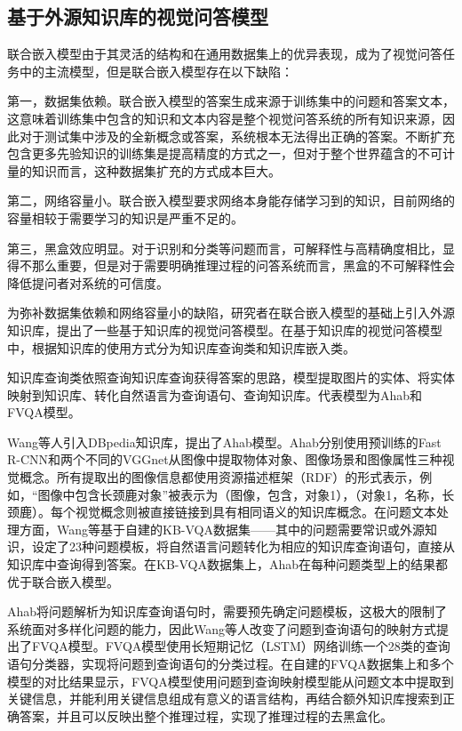 \subsection{基于外源知识库的视觉问答模型}
联合嵌入模型由于其灵活的结构和在通用数据集上的优异表现，成为了视觉问答任务中的主流模型，但是联合嵌入模型存在以下缺陷：

第一，数据集依赖。联合嵌入模型的答案生成来源于训练集中的问题和答案文本，这意味着训练集中包含的知识和文本内容是整个视觉问答系统的所有知识来源，因此对于测试集中涉及的全新概念或答案，系统根本无法得出正确的答案。不断扩充包含更多先验知识的训练集是提高精度的方式之一，但对于整个世界蕴含的不可计量的知识而言，这种数据集扩充的方式成本巨大。

第二，网络容量小。联合嵌入模型要求网络本身能存储学习到的知识，目前网络的容量相较于需要学习的知识是严重不足的。

第三，黑盒效应明显。对于识别和分类等问题而言，可解释性与高精确度相比，显得不那么重要，但是对于需要明确推理过程的问答系统而言，黑盒的不可解释性会降低提问者对系统的可信度。

为弥补数据集依赖和网络容量小的缺陷，研究者在联合嵌入模型的基础上引入外源知识库，提出了一些基于知识库的视觉问答模型。在基于知识库的视觉问答模型中，根据知识库的使用方式分为知识库查询类和知识库嵌入类。

知识库查询类依照查询知识库查询获得答案的思路，模型提取图片的实体、将实体映射到知识库、转化自然语言为查询语句、查询知识库。代表模型为Ahab和FVQA模型。

Wang等人引入DBpedia知识库，提出了Ahab模型。Ahab分别使用预训练的Fast R-CNN和两个不同的VGGnet从图像中提取物体对象、图像场景和图像属性三种视觉概念。所有提取出的图像信息都使用资源描述框架（RDF）的形式表示，例如，“图像中包含长颈鹿对象”被表示为（图像，包含，对象1），（对象1，名称，长颈鹿）。每个视觉概念则被直接链接到具有相同语义的知识库概念。在问题文本处理方面，Wang等基于自建的KB-VQA数据集——其中的问题需要常识或外源知识，设定了23种问题模板，将自然语言问题转化为相应的知识库查询语句，直接从知识库中查询得到答案。在KB-VQA数据集上，Ahab在每种问题类型上的结果都优于联合嵌入模型。

Ahab将问题解析为知识库查询语句时，需要预先确定问题模板，这极大的限制了系统面对多样化问题的能力，因此Wang等人改变了问题到查询语句的映射方式提出了FVQA模型。FVQA模型使用长短期记忆（LSTM）网络训练一个28类的查询语句分类器，实现将问题到查询语句的分类过程。在自建的FVQA数据集上和多个模型的对比结果显示，FVQA模型使用问题到查询映射模型能从问题文本中提取到关键信息，并能利用关键信息组成有意义的语言结构，再结合额外知识库搜索到正确答案，并且可以反映出整个推理过程，实现了推理过程的去黑盒化。

